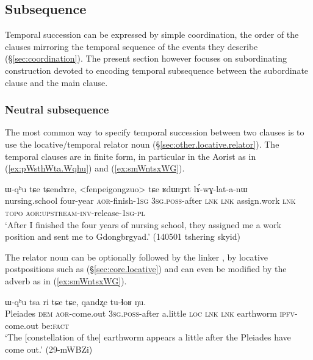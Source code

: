  \subsection{Subsequence} 
Temporal succession can be expressed by simple coordination, the order of the clauses mirroring the temporal sequence of the events they describe (§\ref{sec:coordination}). The present section however focuses on subordinating construction devoted to encoding temporal subsequence between the subordinate clause and the main clause. 

 \subsubsection{Neutral subsequence} \label{sec:subsequence.neutral}
 The most common way to specify temporal succession between two clauses is to use the locative/temporal relator noun    (§\ref{sec:other.locative.relator}). The temporal clauses are in finite form, in particular in the Aorist as in (\ref{ex:pWsthWta.Wqhu}) and (\ref{ex:smWntsxWG}).
 
 
 \begin{exe}
\ex \label{ex:pWsthWta.Wqhu}
 ɯ-qʰu tɕe tɕendɤre, <fenpeigongzuo> tɕe ʁdɯrɟɤt lɤ́-wɣ-lat-a-nɯ \\
 nursing.school four-year \textsc{aor}-finish-\textsc{1sg} \textsc{3sg}.\textsc{poss}-after \textsc{lnk} \textsc{lnk} assign.work \textsc{lnk}  \textsc{topo} \textsc{aor}:\textsc{upstream}-\textsc{inv}-release-\textsc{1sg}-\textsc{pl} \\
 \glt `After I finished the four years of nursing school, they assigned me a work position and sent me to Gdongbrgyad.' (140501 tshering skyid)
 \end{exe}

The relator noun  can be optionally followed by the linker , by locative postpositions such as   (§\ref{sec:core.locative}) and can even be modified by the adverb  as in (\ref{ex:smWntsxWG}).

 \begin{exe}
\ex \label{ex:smWntsxWG}
 ɯ-qʰu tsa ri tɕe tɕe, qandʐe tu-ɬoʁ ŋu. \\
Pleiades \textsc{dem} \textsc{aor}-come.out \textsc{3sg}.\textsc{poss}-after a.little \textsc{loc} \textsc{lnk} \textsc{lnk} earthworm \textsc{ipfv}-come.out be:\textsc{fact} \\
 \glt  `The [constellation of the] earthworm appears a little after the Pleiades have come out.'  (29-mWBZi)
\end{exe}
 
